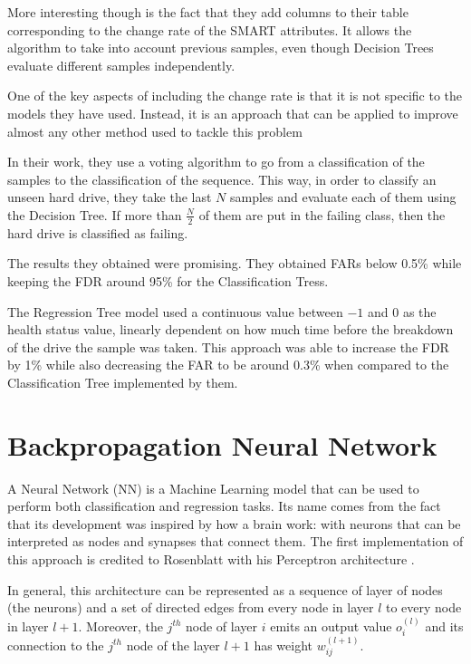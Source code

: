 More interesting though is the fact that they add columns to their table corresponding to the change rate of the SMART attributes.
It allows the algorithm to take into account previous samples, even though Decision Trees evaluate different samples independently.

One of the key aspects of including the change rate is that it is not specific to the models they have used.
Instead, it is an approach that can be applied to improve almost any other method used to tackle this problem 

In their work, they use a voting algorithm to go from a classification of the samples to the classification of the sequence.
This way, in order to classify an unseen hard drive, they take the last $N$ samples and evaluate each of them using the Decision Tree.
If more than $\frac{N}{2}$ of them are put in the failing class, then the hard drive is classified as failing.

The results they obtained were promising.
They obtained FARs below 0.5\% while keeping the FDR around 95\% for the Classification Tress.

The Regression Tree model used a continuous value between $-1$ and $0$ as the health status value, linearly dependent on how much time before the breakdown of the drive the sample was taken.
This approach was able to increase the FDR by 1\% while also decreasing the FAR to be around 0.3\% when compared to the Classification Tree implemented by them.

\section{Backpropagation Neural Network}\label{sec:BackpropagationNeuralNetwork}

A Neural Network (NN) is a Machine Learning model that can be used to perform both classification and regression tasks.
Its name comes from the fact that its development was inspired by how a brain work: with neurons that can be interpreted as nodes and synapses that connect them.
The first implementation of this approach is credited to Rosenblatt with his Perceptron architecture \cite{rosenblatt1957perceptron}.

In general, this architecture can be represented as a sequence of layer of nodes (the neurons) and a set of directed edges from every node in layer $l$ to every node in layer $l+1$.
Moreover, the $j^{th}$ node of layer $i$ emits an output value $o^{(l)}_i$ and its connection to the $j^{th}$ node of the layer $l+1$ has weight $w^{(l+1)}_{ij}$.

